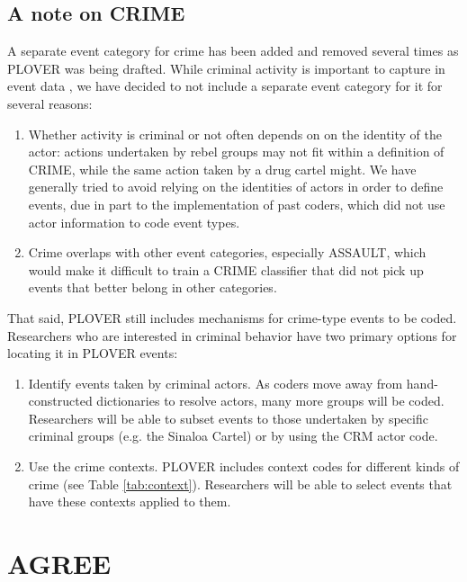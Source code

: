 \documentclass[11pt]{report}
\begin{document}
\subsection{A note on CRIME}

A separate event category for crime has been added and removed several times as PLOVER was being drafted. While criminal activity is important to capture in event data \citep{osorio2015contagion, osorio2017supervised}, we have decided to not include a separate event category for it for several reasons:

\begin{enumerate}

	\item Whether activity is criminal or not often depends on on the identity of the actor: actions undertaken by rebel groups may not fit within a definition of CRIME, while the same action taken by a drug cartel might. We have generally tried to avoid relying on the identities of actors in order to define events, due in part to the implementation of past coders, which did not use actor information to code event types. 
	\item Crime overlaps with other event categories, especially ASSAULT, which would make it difficult to train a CRIME classifier that did not pick up events that better belong in other categories.
\end{enumerate}


That said, PLOVER still includes mechanisms for crime-type events to be coded. Researchers who are interested in criminal behavior have two primary options for locating it in PLOVER events:

\begin{enumerate}
	\item Identify events taken by criminal actors. As coders move away from hand-constructed dictionaries to resolve actors, many more groups will be coded. Researchers will be able to subset events to those undertaken by specific criminal groups (e.g. the Sinaloa Cartel) or by using the CRM actor code.
	\item Use the crime contexts. PLOVER includes context codes for different kinds of crime (see Table \ref{tab:context}). Researchers will be able to select events that have these contexts applied to them.
\end{enumerate}



\section{AGREE}
\end{document}
